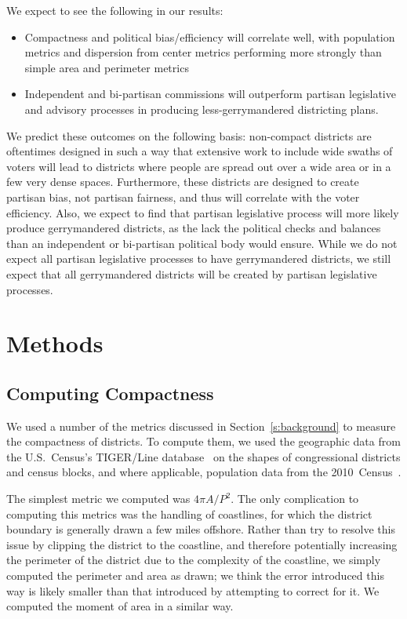 \documentclass[12pt]{article}
\begin{document}
  We expect to see the following in our results:
  \begin{itemize}
  \item Compactness and political bias/efficiency will correlate well, with population metrics and dispersion from center metrics performing more strongly than simple area and perimeter metrics
  \item Independent and bi-partisan commissions will outperform partisan legislative and advisory processes in producing less-gerrymandered districting plans.
  \end{itemize}

  We predict these outcomes on the following basis: non-compact districts are oftentimes designed in such a way that extensive work to include wide swaths of voters will lead to districts where people are spread out over a wide area or in a few very dense spaces.  Furthermore, these districts are designed to create partisan bias, not partisan fairness, and thus will correlate with the voter efficiency.  Also, we expect to find that partisan legislative process will more likely produce gerrymandered districts, as the lack the political checks and balances than an independent or bi-partisan political body would ensure.  While we do not expect all partisan legislative processes to have gerrymandered districts, we still expect that all gerrymandered districts will be created by partisan legislative processes.

  \section{Methods}\label{s:methods}

  \subsection{Computing Compactness}

  We used a number of the metrics discussed in Section~\ref{s:background} to measure the compactness of districts.  To compute them, we used the geographic data from the U.S.~Census's TIGER/Line database~\cite{censustiger} on the shapes of congressional districts and census blocks, and where applicable, population data from the 2010~Census~\cite{census2010}.

  The simplest metric we computed was $4\pi A/P^2$.  The only complication to computing this metrics was the handling of coastlines, for which the district boundary is generally drawn a few miles offshore.  Rather than try to resolve this issue by clipping the district to the coastline, and therefore potentially increasing the perimeter of the district due to the complexity of the coastline, we simply computed the perimeter and area as drawn; we think the error introduced this way is likely smaller than that introduced by attempting to correct for it.  We computed the moment of area in a similar way.
\end{document}
